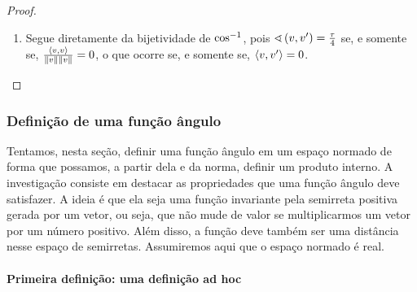 \begin{proof}
\begin{enumerate}
	\item Segue diretamente da bijetividade de $\cos^{-1}$, pois $\sphericalangle\left({v},{v'}\right) = \frac{\tau}{4}$ se, e somente se, $\frac{\left\langle{v},{v}\right\rangle}{\left\Vert{v}\right\Vert\left\Vert{v}\right\Vert}=0$, o que ocorre se, e somente se, $\left\langle{v},{v'}\right\rangle=0$. \qedhere
\end{enumerate}
\end{proof}




\subsubsection{Definição de uma função ângulo}

Tentamos, nesta seção, definir uma função ângulo em um espaço normado de forma que possamos, a partir dela e da norma, definir um produto interno. A investigação consiste em destacar as propriedades que uma função ângulo deve satisfazer. A ideia é que ela seja uma função invariante pela semirreta positiva gerada por um vetor, ou seja, que não mude de valor se multiplicarmos um vetor por um número positivo. Além disso, a função deve também ser uma distância nesse espaço de semirretas. Assumiremos aqui que o espaço normado é real.

\paragraph{Primeira definição: uma definição ad hoc}

